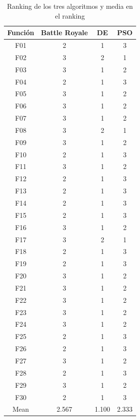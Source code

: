 \documentclass[11pt]{article}
\begin{document}
\begin{table}[H]
\centering
\begin{tabular}{|c|c|c|c|}
\hline
\textbf{Función} & \textbf{Battle Royale} &         \textbf{DE} &        \textbf{PSO} \\
\hline
F01  &             2 &      1 &      3 \\
F02  &             3 &      2 &      1 \\
F03  &             3 &      1 &      2 \\
F04  &             2 &      1 &      3 \\
F05  &             3 &      1 &      2 \\
F06  &             3 &      1 &      2 \\
F07  &             3 &      1 &      2 \\
F08  &             3 &      2 &      1 \\
F09  &             3 &      1 &      2 \\
F10  &             2 &      1 &      3 \\
F11  &             3 &      1 &      2 \\
F12  &             2 &      1 &      3 \\
F13  &             2 &      1 &      3 \\
F14  &             2 &      1 &      3 \\
F15  &             2 &      1 &      3 \\
F16  &             3 &      1 &      2 \\
F17  &             3 &      2 &      1 \\
F18  &             2 &      1 &      3 \\
F19  &             2 &      1 &      3 \\
F20  &             3 &      1 &      2 \\
F21  &             3 &      1 &      2 \\
F22  &             3 &      1 &      2 \\
F23  &             3 &      1 &      2 \\
F24  &             3 &      1 &      2 \\
F25  &             2 &      1 &      3 \\
F26  &             2 &      1 &      3 \\
F27  &             3 &      1 &      2 \\
F28  &             2 &      1 &      3 \\
F29  &             3 &      1 &      2 \\
F30  &             2 &      1 &      3 \\
Mean &         2.567 &  1.100 &  2.333 \\
\hline
\end{tabular}
    \caption{Ranking de los tres algoritmos y media en el ranking}
\end{table}
\end{document}

